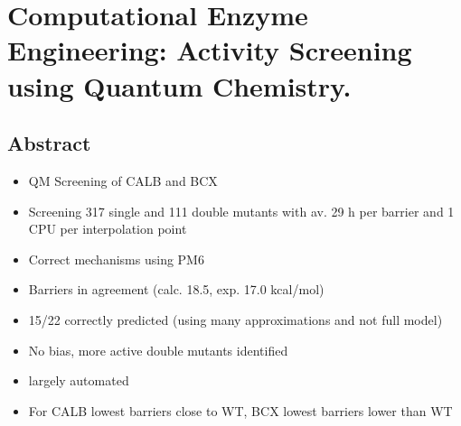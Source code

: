 \chapter[Computational Enzyme Engineering: Activity Screening using Quantum Chemistry.]
{Computational Enzyme Engineering: Activity Screening using Quantum Chemistry.\label{ch1}}


\section{Abstract}\label{sec:abstract}
\begin{itemize}
\item QM Screening of CALB and BCX
\item Screening 317 single and 111 double mutants with av. 29 h per barrier and 1 CPU per interpolation point
\item Correct mechanisms using PM6
\item Barriers in agreement (calc. 18.5, exp. 17.0 kcal/mol)
\item 15/22 correctly predicted (using many approximations and not full model)
\item No bias, more active double mutants identified
\item largely automated
\item For CALB lowest barriers close to WT, BCX lowest barriers lower than WT
\end{itemize}


\clearpage
